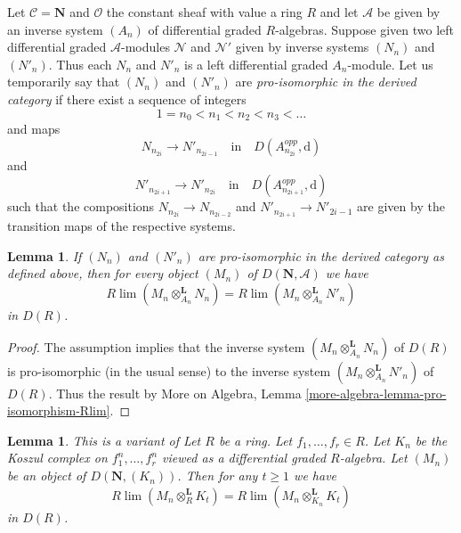 \documentclass{stacks-project}
\newenvironment{reference}{\comment}{\endcomment}
\theoremstyle{plain}
\newtheorem{lemma}[subsection]{Lemma}
\theoremstyle{definition}
\theoremstyle{remark}
\numberwithin{equation}{subsection}
\def\lim{\mathop{\mathrm{lim}}\nolimits}
\begin{document}
\noindent
Let $\mathcal{C} = \mathbf{N}$ and $\mathcal{O}$ the constant sheaf
with value a ring $R$ and let $\mathcal{A}$ be given by an inverse
system $(A_n)$ of differential graded $R$-algebras. Suppose given two
left differential graded $\mathcal{A}$-modules $\mathcal{N}$ and
$\mathcal{N}'$ given by inverse systems $(N_n)$ and $(N'_n)$.
Thus each $N_n$ and $N'_n$ is a left differential graded $A_n$-module.
Let us temporarily say that $(N_n)$ and $(N'_n)$ are
{\it pro-isomorphic in the derived category}
if there exist a sequence of integers
$$
1 = n_0 < n_1 < n_2 < n_3 < \ldots
$$
and maps
$$
N_{n_{2i}} \to N'_{n_{2i - 1}}
\quad\text{in}\quad
D(A_{n_{2i}}^{opp}, \text{d})
$$
and
$$
N'_{n_{2i + 1}} \to N'_{n_{2i}}
\quad\text{in}\quad
D(A_{n_{2i + 1}}^{opp}, \text{d})
$$
such that the compositions $N_{n_{2i}} \to N_{n_{2i - 2}}$
and $N'_{n_{2i + 1}} \to N'_{2i - 1}$ are given by the transition
maps of the respective systems.

\begin{lemma}
\label{lemma-pro-isomorphic-systems-tensor}
If $(N_n)$ and $(N'_n)$ are pro-isomorphic in the derived category
as defined above,
then for every object $(M_n)$ of $D(\mathbf{N}, \mathcal{A})$ we have
$$
R\lim (M_n \otimes_{A_n}^\mathbf{L} N_n) =
R\lim (M_n \otimes_{A_n}^\mathbf{L} N'_n)
$$
in $D(R)$.
\end{lemma}

\begin{proof}
The assumption implies that the inverse system
$(M_n \otimes_{A_n}^\mathbf{L} N_n)$ of $D(R)$ is pro-isomorphic
(in the usual sense) to the inverse system
$(M_n \otimes_{A_n}^\mathbf{L} N'_n)$ of $D(R)$.
Thus the result by
More on Algebra, Lemma \ref{more-algebra-lemma-pro-isomorphism-Rlim}.
\end{proof}

\begin{lemma}
\label{lemma-different-tensors}
\begin{reference}
This is a variant of \cite[Lemma 3.5.4]{BS}
\end{reference}
Let $R$ be a ring. Let $f_1, \ldots, f_r \in R$.
Let $K_n$ be the Koszul complex on $f_1^n, \ldots, f_r^n$
viewed as a differential graded $R$-algebra.
Let $(M_n)$ be an object of $D(\mathbf{N}, (K_n))$.
Then for any $t \geq 1$ we have
$$
R\lim (M_n \otimes_R^\mathbf{L} K_t) =
R\lim (M_n \otimes_{K_n}^\mathbf{L} K_t)
$$
in $D(R)$.
\end{lemma}
\end{document}
